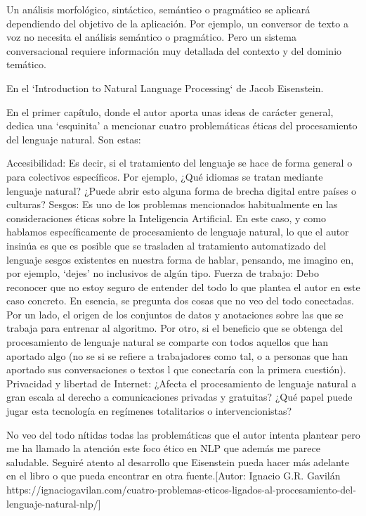 \documentclass[runningheads]{llncs}
\begin{document}
Un análisis morfológico, sintáctico, semántico o pragmático se aplicará dependiendo del objetivo de la aplicación. Por ejemplo, un conversor de texto a voz no necesita el análisis semántico o pragmático. Pero un sistema conversacional requiere información muy detallada del contexto y del dominio temático.


 
En el ‘Introduction to Natural Language Processing‘ de Jacob Eisenstein.

En el primer capítulo, donde el autor aporta unas ideas de carácter general, dedica una ‘esquinita’ a mencionar cuatro problemáticas éticas del procesamiento del lenguaje natural. Son estas:

    Accesibilidad: Es decir, si el tratamiento del lenguaje se hace de forma general o para colectivos específicos. Por ejemplo, ¿Qué idiomas se tratan mediante lenguaje natural? ¿Puede abrir esto alguna forma de brecha digital entre países o culturas?
    Sesgos: Es uno de los problemas mencionados habitualmente en las consideraciones éticas sobre la Inteligencia Artificial. En este caso, y como hablamos específicamente de procesamiento de lenguaje natural, lo que el autor insinúa es que es posible que se trasladen al tratamiento automatizado del lenguaje sesgos existentes en nuestra forma de hablar, pensando, me imagino en, por ejemplo, ‘dejes’ no inclusivos de algún tipo.
    Fuerza de trabajo: Debo reconocer que no estoy seguro de entender del todo lo que plantea el autor en este caso concreto. En esencia, se pregunta dos cosas que no veo del todo conectadas. Por un lado, el origen de los conjuntos de datos y anotaciones sobre las que se trabaja para entrenar al algoritmo. Por otro, si el beneficio que se obtenga del procesamiento de lenguaje natural se comparte con todos aquellos que han aportado algo (no se si se refiere a trabajadores como tal, o a personas que han aportado sus conversaciones o textos l que conectaría con la primera cuestión).
    Privacidad y libertad de Internet: ¿Afecta el procesamiento de lenguaje natural a gran escala al derecho a comunicaciones privadas y gratuitas? ¿Qué papel puede jugar esta tecnología en regímenes totalitarios o intervencionistas?

No veo del todo nítidas todas las problemáticas que el autor intenta plantear pero me ha llamado la atención este foco ético en NLP que además me parece saludable. Seguiré atento al desarrollo que Eisenstein pueda hacer más adelante en el libro o que pueda encontrar en otra fuente.[Autor: Ignacio G.R. Gavilán  https://ignaciogavilan.com/cuatro-problemas-eticos-ligados-al-procesamiento-del-lenguaje-natural-nlp/]
\end{document}
